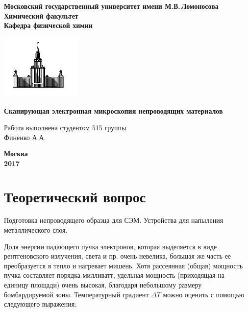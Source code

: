 \documentclass[12pt]{article}
\begin{document}
 

\begin{titlepage}
\centering
\textbf{\large Московский государственный университет имени М.В.\,Ломоносова\\
\vspace*{0.1cm} Химический факультет\\
\vspace*{0.1cm}
\noindent\makebox[\linewidth]{\rule{\paperwidth}{0.4pt}}
\vspace*{0.1cm}
 Кафедра физической химии}
\vspace*{2cm}

\begin{center}
\includegraphics[width=0.3\textwidth]{pictures/logo.jpg}
\end{center}

\vspace*{2cm}
\Large \textbf{Сканирующая электронная микроскопия непроводящих материалов}
\vspace*{6cm}

\begin{flushright}
\large Работа выполнена студентом 515 группы\\
Финенко А.А.\\
\end{flushright}
\vfill
\large\textbf{Москва\\ 2017}
\end{titlepage}

\newpage
\section*{Теоретический вопрос}
Подготовка непроводящего  образца для СЭМ. Устройства для напыления металлического слоя. \par

Доля энергии падающего пучка электронов, которая выделяется в виде рентгеновского излучения, света и пр. очень невелика, большая же часть ее преобразуется в тепло и нагревает мишень. Хотя рассеянная (общая) мощность пучка составляет порядка милливатт, удельная мощность (приходящая на единицу площади) очень высокая, благодаря небольшому размеру бомбардируемой зоны. Температурный градиент $\Delta T$ можно оценить с помощью следующего выражения:
\end{document}
